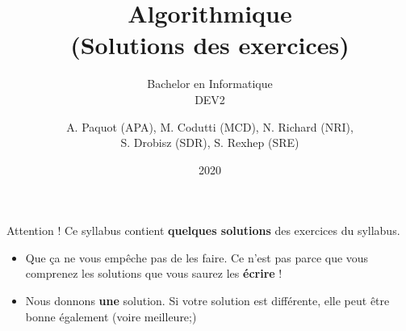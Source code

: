 \documentclass[a4paper,twoside]{style-esi/syllabus}
\title{Algorithmique\\(Solutions des exercices)}
\subtitle{Bachelor en Informatique\\DEV2}
\date{2020}
\author{%
	A. Paquot (APA), M. Codutti (MCD), N. Richard (NRI),\\
	S. Drobisz (SDR),  S. Rexhep (SRE) 
}
\begin{document}
	\maketitle
	\pagedeux	
	\setcounter{tocdepth}{1}
	\tableofcontents

	\vfill
	\begin{alertit}{Attention !}
		Ce syllabus contient \textbf{\color{colalert} quelques solutions} des exercices du syllabus.
		\begin{itemize}
			\item 
				Que ça ne vous empêche pas de les faire.
				Ce n'est pas parce que vous comprenez les solutions
				que vous saurez les \textbf{\color{colalert} écrire} !
			\item 
				Nous donnons \textbf{\color{colalert} une} solution.
				Si votre solution est différente,
				elle peut être bonne également (voire meilleure;)
		\end{itemize}
	\end{alertit}
	\vfill

	\printsolutionstrue
	
\end{document}
